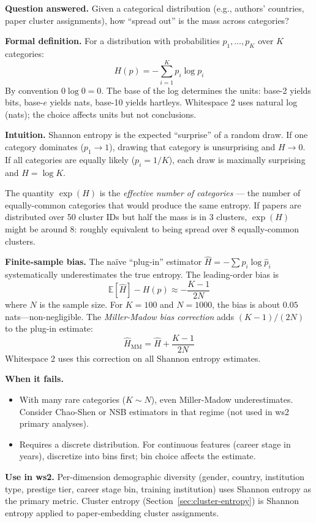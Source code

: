 \documentclass[11pt]{article}
\begin{document}
\textbf{Question answered.} Given a categorical distribution (e.g.,
authors' countries, paper cluster assignments), how ``spread out''
is the mass across categories?

\textbf{Formal definition.} For a distribution with probabilities
$p_1, \ldots, p_K$ over $K$ categories:
\[
  H(p) = -\sum_{i=1}^{K} p_i \log p_i
\]
By convention $0 \log 0 = 0$. The base of the log determines the units:
base-2 yields bits, base-$e$ yields nats, base-10 yields hartleys.
Whitespace 2 uses natural log (nats); the choice affects units but not
conclusions.

\textbf{Intuition.} Shannon entropy is the expected ``surprise'' of a
random draw. If one category dominates ($p_1 \to 1$), drawing that
category is unsurprising and $H \to 0$. If all categories are equally
likely ($p_i = 1/K$), each draw is maximally surprising and
$H = \log K$.

The quantity $\exp(H)$ is the \textit{effective number of categories}
--- the number of equally-common categories that would produce the
same entropy. If papers are distributed over 50 cluster IDs but half
the mass is in 3 clusters, $\exp(H)$ might be around 8: roughly
equivalent to being spread over 8 equally-common clusters.

\textbf{Finite-sample bias.} The naïve ``plug-in'' estimator
$\hat H = -\sum \hat p_i \log \hat p_i$ systematically underestimates
the true entropy. The leading-order bias is
\[
  \mathbb{E}[\hat H] - H(p) \approx -\frac{K-1}{2N}
\]
where $N$ is the sample size. For $K = 100$ and $N = 1000$,
the bias is about $0.05$ nats---non-negligible. The \textit{Miller-Madow
bias correction} adds $(K-1)/(2N)$ to the plug-in estimate:
\[
  \hat H_{\text{MM}} = \hat H + \frac{K-1}{2N}
\]
Whitespace 2 uses this correction on all Shannon entropy estimates.

\textbf{When it fails.}
\begin{itemize}[nosep]
  \item With many rare categories ($K \sim N$), even Miller-Madow
    underestimates. Consider Chao-Shen or NSB estimators in that regime
    (not used in ws2 primary analyses).
  \item Requires a discrete distribution. For continuous features
    (career stage in years), discretize into bins first; bin choice
    affects the estimate.
\end{itemize}

\textbf{Use in ws2.} Per-dimension demographic diversity (gender,
country, institution type, prestige tier, career stage bin, training
institution) uses Shannon entropy as the primary metric. Cluster
entropy (Section~\ref{sec:cluster-entropy}) is Shannon entropy applied
to paper-embedding cluster assignments.
\end{document}
